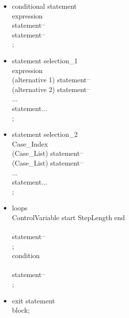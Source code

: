 \begin{itemize}
\item conditional statement\\

       expression\\
       statement$^{...}$\\
       statement$^{...}$\\
      ;

\item statement selection\_1\\

       expression\\
       (alternative 1) statement$^{...}$\\
       (alternative 2) statement$^{...}$\\
      ...\\
       statement${...}$\\
      ;

\item statement selection\_2\\

       Case\_Index\\
       (Case\_List) statement$^{...}$\\
       (Case\_List) statement$^{...}$\\
      ...\\
       statement${...}$\\
      ;

\item loops\\

       ControlVariable  start  StepLength  end\\
      \\
      statement$^{...}$\\
      ;\\

       condition\\
      \\
      statement$^{...}$\\
      ;

\item exit statement\\

       block;
\end{itemize}

